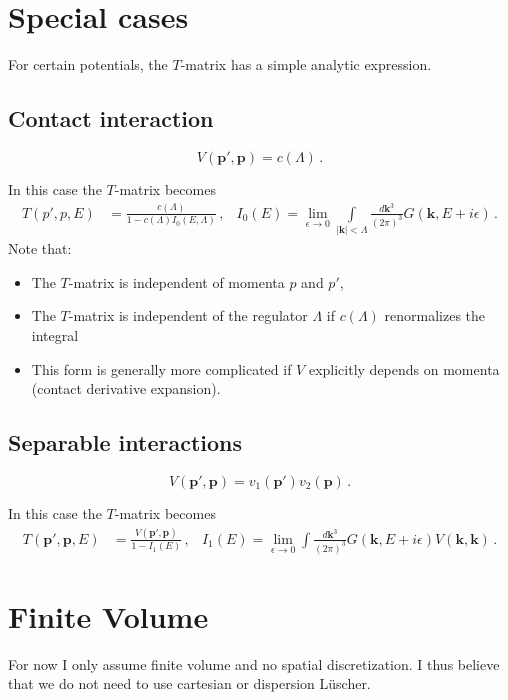 \documentclass[
    aps,
    prl,
    showkeys,
    nofootinbib,
    floatfix
]{revtex4}
\renewcommand{\vec}[1]{\boldsymbol{#1}}
\begin{document}
\section{Special cases}

For certain potentials, the $T$-matrix has a simple analytic expression.

\subsection{Contact interaction}
\begin{equation}
	V(\vec p', \vec p) = c(\Lambda) \, .
\end{equation}

In this case the $T$-matrix becomes
\begin{align}\label{eq:quantization-contact-physical}
	T(p', p, E) &= \frac{c(\Lambda)}{1 - c(\Lambda) I_0(E, \Lambda)} \, , &
	I_0(E) = \lim\limits_{\epsilon \to 0} \int\limits_{|\vec k| < \Lambda} \frac{d \vec k^3}{(2\pi)^3} G(\vec k, E + i \epsilon)
	\, .
\end{align}
Note that:
\begin{itemize}
	\item The $T$-matrix is independent of momenta $p$ and $p'$,
	\item The $T$-matrix is independent of the regulator $\Lambda$ if $c(\Lambda)$ renormalizes the integral
	\item This form is generally more complicated if $V$ explicitly depends on momenta (contact derivative expansion).
\end{itemize}

\subsection{Separable interactions}
\begin{equation}
	V(\vec p', \vec p) = v_1(\vec p') v_2(\vec p) \, .
\end{equation}

In this case the $T$-matrix becomes
\begin{align}\label{eq:quantization-separable-physical}
	T(\vec p', \vec p, E) &= \frac{V(\vec p', \vec p)}{1 - I_1(E)} \, , &
	I_1(E) = \lim\limits_{\epsilon \to 0} \int \frac{d \vec k^3}{(2\pi)^3} G(\vec k, E + i \epsilon) V(\vec k, \vec k)
	\, .
\end{align}

\section{Finite Volume}
For now I only assume finite volume and no spatial discretization.
I thus believe that we do not need to use cartesian or dispersion Lüscher.
\end{document}
